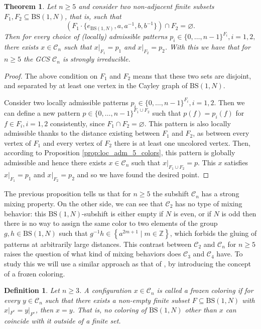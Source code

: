 \documentclass[cupthm,crop,info]{CUP-JNL-ETS}%
\theoremstyle{cupplain}
\newtheorem{theorem}{Theorem}[section]
\theoremstyle{cupdefinition}
\newtheorem{definition}{Definition}[section]
\theoremstyle{cupremark}
\theoremstyle{cupproof}
\newtheorem{proof}{Proof}
\numberwithin{equation}{section}
\newcommand{\BS}[1][N]{\mathrm{BS}(1,#1)}
\begin{document}
\begin{theorem}\label{thm:gcs_mixing_n5} Let $n\ge 5$ and consider two non-adjacent finite subsets $F_1,F_2\subseteq \BS$, that is, such that 
	$$\left( F_1\cdot \{e_{\BS},a,a^{-1},b,b^{-1}\}\right)\cap F_2=\varnothing.$$
	Then for every choice of (locally) admissible patterns $p_i\in \{0,\ldots,n-1\}^{F_i}, i=1,2,$ there exists $x\in \mathcal{C}_n$ such that $x|_{F_1}=p_1$ and $x|_{F_2}=p_2$. With this we have that for $n\ge 5$ the GCS $\mathcal{C}_n$ is strongly irreducible.
\end{theorem}
\begin{proof}
	The above condition on $F_1$ and $F_2$ means that these two sets are disjoint, and separated by at least one vertex in the Cayley graph of $\BS$. 
	
	Consider two locally admissible patterns $p_i\in \{0,\ldots,n-1\}^{F_i}, i=1,2$. Then we can define a new pattern $p\in \{0,\ldots,n-1\}^{F_1\cup F_2}$ such that $p(f)=p_i(f)$ for $f\in F_i, i=1,2$ consistently, since $F_1\cap F_2=\varnothing.$ This pattern is also locally admissible thanks to the distance existing between $F_1$ and $F_2$, as between every vertex of $F_1$ and every vertex of $F_2$ there is at least one uncolored vertex. Then, according to Proposition \ref{prop:loc_adm_5_colors}, this pattern is globally admissible and hence there exists $x\in \mathcal{C}_n$ such that $x|_{F_1\cup F_2}=p$. This $x$ satisfies $x|_{F_1}=p_1$ and $x|_{F_2}=p_2$ and so we have found the desired point.
\end{proof}


The previous proposition tells us that for $n\ge 5$ the subshift $\mathcal{C}_n$ has a strong mixing property. On the other side, we can see that $\mathcal{C}_2$ has no type of mixing behavior: this $\BS$-subshift is either empty if $N$ is even, or if $N$ is odd then there is no way to assign the same color to two elements of the group $g,h\in \BS$ such that $g^{-1}h\in \left\{a^{2m+1}\mid m\in \mathbb{Z} \right\}$, which forbids the gluing of patterns at arbitrarily large distances. This contrast between $\mathcal{C}_2$ and $\mathcal{C}_n$ for $n\ge 5$ raises the question of what kind of mixing behaviors does $\mathcal{C}_3$ and $\mathcal{C}_4$ have. To study this we will use a similar approach as that of \cite{alon2019mixing}, by introducing the concept of a frozen coloring.
\begin{definition} Let $n\ge 3$. A configuration $x\in \mathcal{C}_n$ is called a \textit{frozen coloring} if for every $y\in \mathcal{C}_n$ such that there exists a non-empty finite subset $F\subseteq \BS$ with $x|_{F^c}=y|_{F^c}$, then $x= y$. That is, no coloring of $\BS$ other than $x$ can coincide with it outside of a finite set.
\end{definition}
\end{document}
